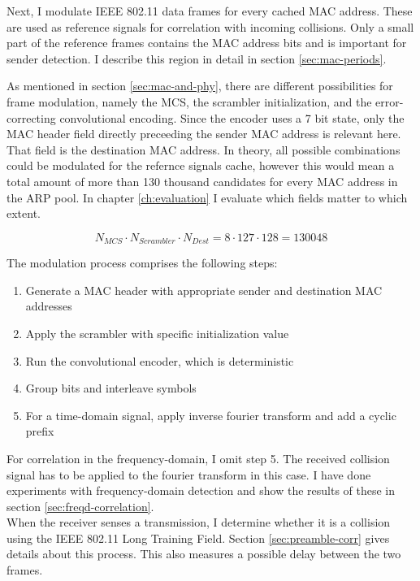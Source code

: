 Next, I modulate IEEE 802.11 data frames for every cached MAC address. These are used as reference signals for correlation with incoming collisions. Only a small part of the reference frames contains the MAC address bits and is important for sender detection. I describe this region in detail in section \ref{sec:mac-periods}.

As mentioned in section \ref{sec:mac-and-phy}, there are different possibilities for frame modulation, namely the \gls{MCS}, the scrambler initialization, and the error-correcting convolutional encoding. Since the encoder uses a 7 bit state, only the MAC header field directly preceeding the sender MAC address is relevant here. That field is the destination MAC address. In theory, all possible combinations could be modulated for the refernce signals cache, however this would mean a total amount of  more than 130 thousand candidates for every MAC address in the ARP pool. In chapter \ref{ch:evaluation} I evaluate which fields matter to which extent.

$$ N_{MCS} \cdot N_{Scrambler} \cdot N_{Dest} = 8 \cdot 127 \cdot 128 = 130 048 $$\vspace{0cm}

The modulation process comprises the following steps:

\begin{enumerate}
	\item Generate a MAC header with appropriate sender and destination MAC addresses
	\item Apply the scrambler with specific initialization value
	\item Run the convolutional encoder, which is deterministic
	\item Group bits and interleave symbols
	\item For a time-domain signal, apply inverse fourier transform and add a cyclic prefix
\end{enumerate}

For correlation in the frequency-domain, I omit step 5. The received collision signal has to be applied to the fourier transform in this case. I have done experiments with frequency-domain detection and show the results of these in section \ref{sec:freqd-correlation}.\\

When the receiver senses a transmission, I determine whether it is a collision using the IEEE 802.11 Long Training Field. Section \ref{sec:preamble-corr} gives details about this process. This also measures a possible delay between the two frames.

